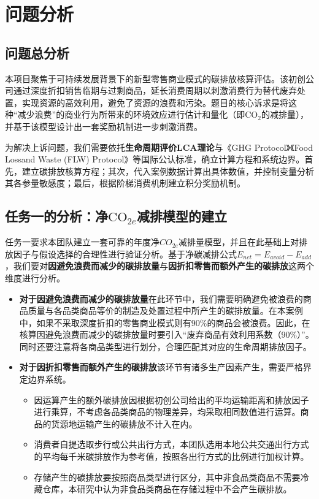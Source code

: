 \documentclass{article}
\begin{document}
\section{问题分析}

\subsection{问题总分析}

本项目聚焦于可持续发展背景下的新型零售商业模式的碳排放核算评估。该初创公司通过深度折扣销售临期与过剩商品，延长消费周期以刺激消费行为替代废弃处置，实现资源的高效利用，避免了资源的浪费和污染。题目的核心诉求是将这种“减少浪费”的商业行为所带来的环境效应进行估计和量化（即$\mathrm{CO}_{2}$的减排量），并基于该模型设计出一套奖励机制进一步刺激消费。

为解决上诉问题，我们需要依托\textbf{生命周期评价LCA理论}与《GHG Protocol》《Food Lossand Waste (FLW) Protocol》等国际公认标准，确立计算方程和系统边界。首先，建立碳排放核算方程；其次，代入案例数据计算出具体数值，并控制变量分析其各参量敏感度；最后，根据阶梯消费机制建立积分奖励机制。
\subsection{任务一的分析：净$\mathrm{CO}_{2e}$减排模型的建立}

任务一要求本团队建立一套可靠的年度净$CO_{2e}$减排量模型，并且在此基础上对排放因子与假设选择的合理性进行验证分析。基于净碳减排公式$E_{net} = E_{avoid} - E_{add}$，我们要对\textbf{因避免浪费而减少的碳排放量}与\textbf{因折扣零售而额外产生的碳排放}这两个维度进行分析。

\begin{itemize}
    \item \textbf{对于因避免浪费而减少的碳排放量}在此环节中，我们需要明确避免被浪费的商品质量与各品类商品等价的制造及处置过程中所产生的碳排放量。在本案例中，如果不采取深度折扣的零售商业模式则有$90\%$的商品会被浪费。因此，在核算因避免浪费而减少的碳排放量时要引入“废弃商品有效利用系数（$90\%$）”。同时还要注意将各商品类型进行划分，合理匹配其对应的生命周期排放因子。
    \item \textbf{对于因折扣零售而额外产生的碳排放}该环节有诸多生产因素产生，需要严格界定边界系统。
    \begin{itemize}
        \item 因运算产生的额外碳排放因根据初创公司给出的平均运输距离和排放因子进行乘算，不考虑各品类商品的物理差异，均采取相同数值进行运算。商品的货源地运输产生的碳排放不计入在内。
        \item 消费者自提选取步行或公共出行方式，本团队选用本地公共交通出行方式的平均每千米碳排放作为参考值，按照各出行方式的比例进行加权计算。
        \item 存储产生的碳排放要按照商品类型进行区分，其中非食品类商品不需要冷藏仓库，本研究中认为非食品类商品在存储过程中不会产生碳排放。
    \end{itemize}
\end{itemize}
\end{document}
